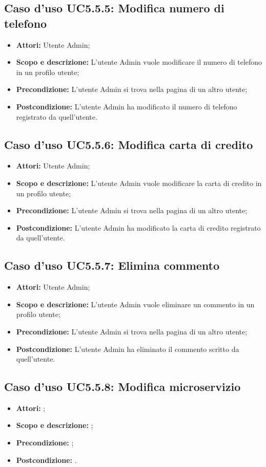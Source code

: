 \documentclass[12pt,a4paper,titlepage]{article}
\begin{document}
\subsection{Caso d'uso UC5.5.5: Modifica numero di telefono}
\begin{itemize}
	\item \textbf{Attori: }Utente Admin;
	\item \textbf{Scopo e descrizione: }L'utente Admin vuole modificare il numero di telefono in un profilo utente;
	\item \textbf{Precondizione: }L'utente Admin si trova nella pagina di un altro utente;
	\item \textbf{Postcondizione: }L'utente Admin ha modificato il numero di telefono registrato da quell'utente.
\end{itemize}
\subsection{Caso d'uso UC5.5.6: Modifica carta di credito}
\begin{itemize}
	\item \textbf{Attori: }Utente Admin;
	\item \textbf{Scopo e descrizione: }L'utente Admin vuole modificare la carta di credito in un profilo utente;
	\item \textbf{Precondizione: }L'utente Admin si trova nella pagina di un altro utente;
	\item \textbf{Postcondizione: }L'utente Admin ha modificato la carta di credito registrato da quell'utente.
\end{itemize}
\subsection{Caso d'uso UC5.5.7: Elimina commento}
\begin{itemize}
	\item \textbf{Attori: }Utente Admin;
	\item \textbf{Scopo e descrizione: }L'utente Admin vuole eliminare un commento in un profilo utente;
	\item \textbf{Precondizione: }L'utente Admin si trova nella pagina di un altro utente;
	\item \textbf{Postcondizione: }L'utente Admin ha eliminato il commento scritto da quell'utente.
\end{itemize}
\subsection{Caso d'uso UC5.5.8: Modifica microservizio}
\begin{itemize}
	\item \textbf{Attori: };
	\item \textbf{Scopo e descrizione: };
	\item \textbf{Precondizione: };
	\item \textbf{Postcondizione: }.
\end{itemize}
\end{document}
